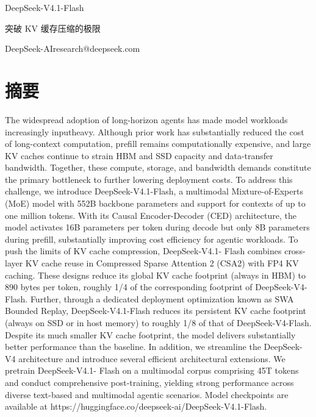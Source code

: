 \documentclass[
  10
]{article}
\author{}
\date{}
\begin{document}
\begin{center}
{\LARGE DeepSeek-V4.1-Flash\par}
\vspace{0.5em}
{\large 突破 KV 缓存压缩的极限\par}
\vspace{0.8em}
{\normalsize DeepSeek-AI\quad research@deepseek.com\par}
\end{center}

\section*{摘要}

\renewcommand{\figurename}{图}
\renewcommand{\tablename}{表}\label{abstract}

The widespread adoption of long-horizon agents has made model workloads
increasingly inputheavy. Although prior work has substantially reduced
the cost of long-context computation, prefill remains computationally
expensive, and large KV caches continue to strain HBM and SSD capacity
and data-transfer bandwidth. Together, these compute, storage, and
bandwidth demands constitute the primary bottleneck to further lowering
deployment costs. To address this challenge, we introduce
DeepSeek-V4.1-Flash, a multimodal Mixture-of-Experts (MoE) model with
552B backbone parameters and support for contexts of up to one million
tokens. With its Causal Encoder-Decoder (CED) architecture, the model
activates 16B parameters per token during decode but only 8B parameters
during prefill, substantially improving cost efficiency for agentic
workloads. To push the limits of KV cache compression, DeepSeek-V4.1-
Flash combines cross-layer KV cache reuse in Compressed Sparse Attention
2 (CSA2) with FP4 KV caching. These designs reduce its global KV cache
footprint (always in HBM) to 890 bytes per token, roughly 1/4 of the
corresponding footprint of DeepSeek-V4-Flash. Further, through a
dedicated deployment optimization known as SWA Bounded Replay,
DeepSeek-V4.1-Flash reduces its persistent KV cache footprint (always on
SSD or in host memory) to roughly 1/8 of that of DeepSeek-V4-Flash.
Despite its much smaller KV cache footprint, the model delivers
substantially better performance than the baseline. In addition, we
streamline the DeepSeek-V4 architecture and introduce several efficient
architectural extensions. We pretrain DeepSeek-V4.1- Flash on a
multimodal corpus comprising 45T tokens and conduct comprehensive
post-training, yielding strong performance across diverse text-based and
multimodal agentic scenarios. Model checkpoints are available at
https://huggingface.co/deepseek-ai/DeepSeek-V4.1-Flash.
\end{document}
